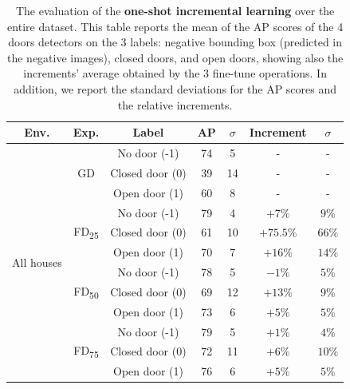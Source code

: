 \begin{table}[h!]
	\centering
	\begin{tabular}{ccccccc}
		
		\toprule
		\textbf{Env.} & \textbf{Exp.} & \textbf{Label} & \textbf{AP} & \textbf{$\sigma$} & \textbf{Increment} &  \textbf{$\sigma$} \\
		\midrule
		\multicolumn{1}{c|}{\multirow{12}{*}{All houses}} & \multicolumn{1}{c|}{\multirow{3}{*}{\textsf{GD}}} & No door (-1) & 74 & 5 & - & - \tabularnewline 
		\multicolumn{1}{c|}{}& \multicolumn{1}{c|}{} & Closed door (0) & 39 & 14 & - & -  \\
		\multicolumn{1}{c|}{}& \multicolumn{1}{c|}{}& Open door (1) & 60 & 8 & - & -  \\  \cline{2-7}
		\multicolumn{1}{c|}{}& \multicolumn{1}{c|}{\multirow{3}{*}{\textsf{FD\textsubscript{25}}}} & No door (-1) & 79 & 4 & $+7\%$ & $9\%$ \tabularnewline [1pt]
		\multicolumn{1}{c|}{}& \multicolumn{1}{c|}{} & Closed door (0) & 61 & 10 &  $+75.5\%$ & $66\%$  \\ 
		\multicolumn{1}{c|}{}& \multicolumn{1}{c|}{} & Open door (1) & 70 & 7 & $+16\%$ & $14\%$  \\ \cline{2-7}
		\multicolumn{1}{c|}{} & \multicolumn{1}{c|}{\multirow{3}{*}{\textsf{FD\textsubscript{50}}}} & No door (-1) & 78 & 5 & $-1\%$ & $5\%$  \tabularnewline 
		\multicolumn{1}{c|}{}& \multicolumn{1}{c|}{} & Closed door (0) & 69 & 12 & $+13\%$ & $9\%$ \\
		\multicolumn{1}{c|}{}& \multicolumn{1}{c|}{}& Open door (1) & 73 & 6 & $+5\%$ & $5\%$ \\  \cline{2-7}
		\multicolumn{1}{c|}{}& \multicolumn{1}{c|}{\multirow{3}{*}{\textsf{FD\textsubscript{75}}}} & No door (-1) & 79 & 5 & $+1\%$ & $4\%$  \tabularnewline [1pt]
		\multicolumn{1}{c|}{}& \multicolumn{1}{c|}{} & Closed door (0) & 72 & 11 & $+6\%$ & $10\%$  \\ 
		\multicolumn{1}{c|}{}& \multicolumn{1}{c|}{} & Open door (1) & 76 & 6 & $+5\%$ & $5\%$  \\ 
		\bottomrule
	\end{tabular}
	\caption{The evaluation of the \textbf{one-shot incremental learning} over the entire dataset. This table reports the mean of the AP scores of the 4 doors detectors on the 3 labels: negative bounding box (predicted in the negative images), closed doors, and open doors, showing also the increments' average obtained by the 3 fine-tune operations. In addition, we report the standard deviations for the AP scores and the relative increments.}
	\label{tab:all_houses_results}
\end{table}


